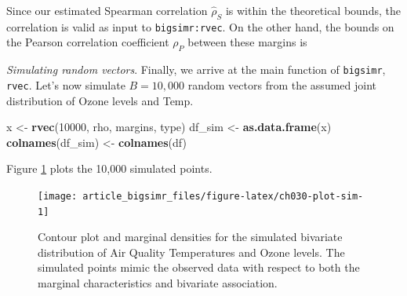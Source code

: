 \documentclass[]{article}
\newenvironment{Shaded}{\begin{snugshade}}{\end{snugshade}}
\newcommand{\DataTypeTok}[1]{\textcolor[rgb]{0.13,0.29,0.53}{#1}}
\newcommand{\DecValTok}[1]{\textcolor[rgb]{0.00,0.00,0.81}{#1}}
\newcommand{\FloatTok}[1]{\textcolor[rgb]{0.00,0.00,0.81}{#1}}
\newcommand{\KeywordTok}[1]{\textcolor[rgb]{0.13,0.29,0.53}{\textbf{#1}}}
\newcommand{\NormalTok}[1]{#1}
\newcommand{\OperatorTok}[1]{\textcolor[rgb]{0.81,0.36,0.00}{\textbf{#1}}}
\newcommand{\StringTok}[1]{\textcolor[rgb]{0.31,0.60,0.02}{#1}}
\begin{document}
Since our estimated Spearman correlation \(\hat{ \rho}_S\) is within the theoretical bounds, the correlation is valid as input to \texttt{bigsimr:rvec}.
On the other hand, the bounds on the Pearson correlation coefficient \(\rho_P\) between these margins is

\begin{Shaded}
\end{Shaded}

\emph{Simulating random vectors}.
Finally, we arrive at the main function of \texttt{bigsimr}, \texttt{rvec}.
Let's now simulate \(B=10,000\) random vectors from the assumed joint distribution of Ozone levels and Temp.

\begin{Shaded}
\begin{Highlighting}[]
\NormalTok{x <-}\StringTok{ }\KeywordTok{rvec}\NormalTok{(}\DecValTok{10000}\NormalTok{, rho, margins, type)}
\NormalTok{df_sim <-}\StringTok{ }\KeywordTok{as.data.frame}\NormalTok{(x)}
\KeywordTok{colnames}\NormalTok{(df_sim) <-}\StringTok{ }\KeywordTok{colnames}\NormalTok{(df)}
\end{Highlighting}
\end{Shaded}

Figure \ref{fig:ch030-plot-sim} plots the 10,000 simulated points.

\begin{figure}

{\centering \texttt{[image: article\_bigsimr\_files/figure-latex/ch030-plot-sim-1]} 

}

\caption{Contour plot and marginal densities for the simulated bivariate distribution of Air Quality Temperatures and Ozone levels. The simulated points mimic the observed data with respect to both the marginal characteristics and bivariate association.}\label{fig:ch030-plot-sim}
\end{figure}
\end{document}
